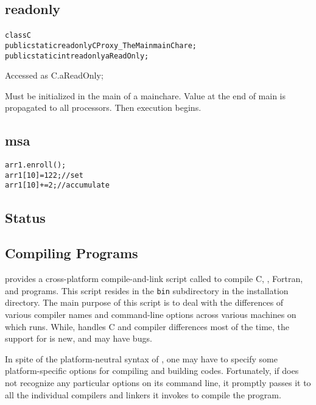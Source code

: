\documentclass[10pt]{article}
\begin{document}
\subsection{readonly}

\begin{alltt}
class C {
    public static readonly CProxy_TheMain mainChare;
    public static int readonly aReadOnly;
}
\end{alltt}

Accessed as C.aReadOnly;

Must be initialized in the main of a mainchare.  Value at the end of main is
propagated to all processors.  Then execution begins.

\subsection{msa}

\begin{alltt}
arr1.enroll();
arr1[10] = 122; // set
arr1[10] += 2;  // accumulate
\end{alltt}

\subsection{\jade Status}

\subsection{Compiling \jade Programs}

\charmpp{} provides a cross-platform compile-and-link script called \charmc{}
to compile C, \CC{}, Fortran, \charmpp{} and \jade programs.  This script
resides in the \texttt{bin} subdirectory in the \charmpp{} installation
directory. The main purpose of this script is to deal with the differences of
various compiler names and command-line options across various machines on
which \charmpp{} runs. While, \charmc{} handles C and \CC{} compiler
differences most of the time, the support for \jade is new, and may have
bugs.

In spite of the platform-neutral syntax of \charmc{}, one may have to specify
some platform-specific options for compiling and building \jade codes.
Fortunately, if \charmc{} does not recognize any particular options on its
command line, it promptly passes it to all the individual compilers and linkers
it invokes to compile the program.

\appendix
\end{document}
